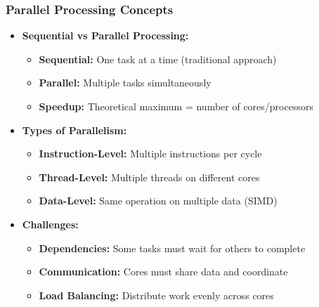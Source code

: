 \begin{frame}
\frametitle{Parallel Processing Concepts}
\begin{itemize}
    \item \textbf{Sequential vs Parallel Processing:}
    \begin{itemize}
        \item \textbf{Sequential:} One task at a time (traditional approach)
        \item \textbf{Parallel:} Multiple tasks simultaneously
        \item \textbf{Speedup:} Theoretical maximum = number of cores/processors
    \end{itemize}
    \item \textbf{Types of Parallelism:}
    \begin{itemize}
        \item \textbf{Instruction-Level:} Multiple instructions per cycle
        \item \textbf{Thread-Level:} Multiple threads on different cores
        \item \textbf{Data-Level:} Same operation on multiple data (SIMD)
    \end{itemize}
    \item \textbf{Challenges:}
    \begin{itemize}
        \item \textbf{Dependencies:} Some tasks must wait for others to complete
        \item \textbf{Communication:} Cores must share data and coordinate
        \item \textbf{Load Balancing:} Distribute work evenly across cores
    \end{itemize}
\end{itemize}
\end{frame}

